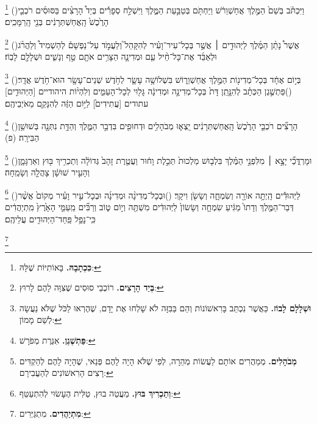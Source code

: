 \documentclass[12pt, openany]{book}
\newcommand{\footnotecomment}[1]{
	\renewcommand\thefootnote{}
	\footnote{\textsf{#1}}}
\newcommand{\commenta}[1]{\footnotecomment{#1}\hspace{0em}}
\newcommand{\vsnum}[1]{(\hebrewnumeral{#1})\space}
\begin{document}
\begin{multicols}{2}
\commenta{\textrm{\textbf{כִּכְתָבָהּ.}} בָּאוֹתִיּוֹת שֶׁלָּהּ:}%
\vsnum{10}וַיִּכְתֹּ֗ב בְּשֵׁם֙ הַמֶּ֣לֶךְ אֲחַשְׁוֵרֹ֔שׁ וַיַּחְתֹּ֖ם בְּטַבַּ֣עַת הַמֶּ֑לֶךְ וַיִּשְׁלַ֣ח סְפָרִ֡ים בְּיַד֩ הָרָצִ֨ים בַּסּוּסִ֜ים רֹכְבֵ֤י הָרֶ֙כֶשׁ֙ הָֽאֲחַשְׁתְּרָנִ֔ים בְּנֵ֖י הָֽרַמָּכִֽים׃%
\commenta{\textrm{\textbf{בְּיַד הָרָצִים.}} רוֹכְבֵי סוּסִים שֶׁצִּוָּה לָהֶם לָרוּץ:}%
\vsnum{11}אֲשֶׁר֩ נָתַ֨ן הַמֶּ֜לֶךְ לַיְּהוּדִ֣ים ׀ אֲשֶׁ֣ר בְּכָל־עִיר־וָעִ֗יר לְהִקָּהֵל֮ וְלַעֲמֹ֣ד עַל־נַפְשָׁם֒ לְהַשְׁמִיד֩ וְלַהֲרֹ֨ג וּלְאַבֵּ֜ד אֶת־כָּל־חֵ֨יל עַ֧ם וּמְדִינָ֛ה הַצָּרִ֥ים אֹתָ֖ם טַ֣ף וְנָשִׁ֑ים וּשְׁלָלָ֖ם לָבֽוֹז׃%
\commenta{\textrm{\textbf{וּשְׁלָלָם לָבוֹז.}} כַּאֲשֶׁר נִכְתַּב בָּרִאשׁוֹנוֹת וְהֵם בַּבִּזָּה לֹא שָׁלְחוּ אֶת יָדָם, שֶׁהֶרְאוּ לַכֹּל שֶׁלֹּא נַעֲשָׂה לְשֵׁם מָמוֹן: }%
\vsnum{12}בְּי֣וֹם אֶחָ֔ד בְּכָל־מְדִינ֖וֹת הַמֶּ֣לֶךְ אֲחַשְׁוֵר֑וֹשׁ בִּשְׁלוֹשָׁ֥ה עָשָׂ֛ר לְחֹ֥דֶשׁ שְׁנֵים־עָשָׂ֖ר הוּא־חֹ֥דֶשׁ אֲדָֽר׃
\vsnum{13}פַּתְשֶׁ֣גֶן הַכְּתָ֗ב לְהִנָּ֤תֵֽן דָּת֙ בְּכָל־מְדִינָ֣ה וּמְדִינָ֔ה גָּל֖וּי לְכָל־הָעַמִּ֑ים וְלִהְי֨וֹת היהודיים [הַיְּהוּדִ֤ים] עתודים [עֲתִידִים֙] לַיּ֣וֹם הַזֶּ֔ה לְהִנָּקֵ֖ם מֵאֹיְבֵיהֶֽם׃%
\commenta{\textrm{\textbf{פַּתְשֶׁגֶן.}} אִגֶּרֶת מְפֹרָשׁ:}%
\vsnum{14}הָרָצִ֞ים רֹכְבֵ֤י הָרֶ֙כֶשׁ֙ הָֽאֲחַשְׁתְּרָנִ֔ים יָֽצְא֛וּ מְבֹהָלִ֥ים וּדְחוּפִ֖ים בִּדְבַ֣ר הַמֶּ֑לֶךְ וְהַדָּ֥ת נִתְּנָ֖ה בְּשׁוּשַׁ֥ן הַבִּירָֽה׃ (פ)%
\commenta{\textrm{\textbf{מְבֹהָלִים.}} מְמַהֲרִים אוֹתָם לַעֲשׂוֹת מְהֵרָה, לְפִי שֶׁלֹּא הָיָה לָהֶם פְּנַאי, שֶׁהָיָה לָהֶם לְהַקְדִּים רָצִים הָרִאשׁוֹנִים לְהַעֲבִירָם: }%
\vsnum{15}וּמָרְדֳּכַ֞י יָצָ֣א ׀ מִלִּפְנֵ֣י הַמֶּ֗לֶךְ בִּלְב֤וּשׁ מַלְכוּת֙ תְּכֵ֣לֶת וָח֔וּר וַעֲטֶ֤רֶת זָהָב֙ גְּדוֹלָ֔ה וְתַכְרִ֥יךְ בּ֖וּץ וְאַרְגָּמָ֑ן וְהָעִ֣יר שׁוּשָׁ֔ן צָהֲלָ֖ה וְשָׂמֵֽחָה׃%
\commenta{\textrm{\textbf{וְתַכְרִיךְ בּוּץ.}} מַעֲטֵה בוּץ, טַלִּית הֶעָשׂוּי לְהִתְעַטֵּף: }%
\vsnum{16}לַיְּהוּדִ֕ים הָֽיְתָ֥ה אוֹרָ֖ה וְשִׂמְחָ֑ה וְשָׂשֹׂ֖ן וִיקָֽר׃
\vsnum{17}וּבְכָל־מְדִינָ֨ה וּמְדִינָ֜ה וּבְכָל־עִ֣יר וָעִ֗יר מְקוֹם֙ אֲשֶׁ֨ר דְּבַר־הַמֶּ֤לֶךְ וְדָתוֹ֙ מַגִּ֔יעַ שִׂמְחָ֤ה וְשָׂשׂוֹן֙ לַיְּהוּדִ֔ים מִשְׁתֶּ֖ה וְי֣וֹם ט֑וֹב וְרַבִּ֞ים מֵֽעַמֵּ֤י הָאָ֙רֶץ֙ מִֽתְיַהֲדִ֔ים כִּֽי־נָפַ֥ל פַּֽחַד־הַיְּהוּדִ֖ים עֲלֵיהֶֽם׃%
\commenta{\textrm{\textbf{מִתְיַהֲדִים.}} מִתְגַּיְּרִים:}%
\end{multicols}\newpage
\end{document}
